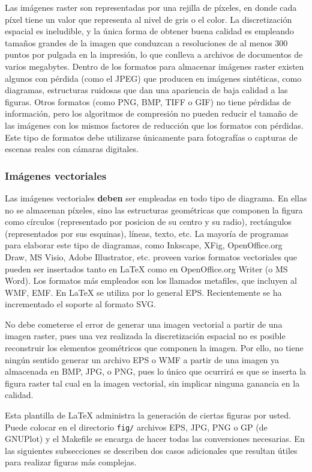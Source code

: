 Las imágenes raster son representadas por una rejilla de píxeles, en donde cada
píxel tiene un valor que representa al nivel de gris o el color. La
discretización espacial es ineludible, y la única forma de obtener buena
calidad es empleando tamaños grandes de la imagen que conduzcan a resoluciones
de al menos 300 puntos por pulgada en la impresión, lo que conlleva a archivos
de documentos de varios megabytes. Dentro de los formatos para almacenar
imágenes raster existen algunos con pérdida (como el JPEG) que producen en
imágenes sintéticas, como diagramas, estructuras ruidosas que dan una
apariencia de baja calidad a las figuras. Otros formatos (como PNG, BMP, TIFF o
GIF) no tiene pérdidas de información, pero los algoritmos de compresión no
pueden reducir el tamaño de las imágenes con los mismos factores de reducción
que los formatos con pérdidas. Este tipo de formatos debe utilizarse únicamente
para fotografías o capturas de escenas reales con cámaras digitales.

\subsubsection{Imágenes vectoriales}

Las imágenes vectoriales \textbf{deben} ser empleadas en todo tipo de
diagrama. En ellas no se almacenan píxeles, sino las estructuras geométricas
que componen la figura como círculos (representado por posicion de su centro y
su radio), rectángulos (representados por sus esquinas), líneas, texto, etc. La
mayoría de programas para elaborar este tipo de diagramas, como Inkscape, XFig,
OpenOffice.org Draw, MS Visio, Adobe Illustrator, etc. proveen varios formatos
vectoriales que pueden ser insertados tanto en LaTeX como en OpenOffice.org
Writer (o MS Word). Los formatos más empleados son los llamados metafiles, que
incluyen al WMF, EMF. En LaTeX se utiliza por lo general EPS. Recientemente se
ha incrementado el soporte al formato SVG.

No debe cometerse el error de generar una imagen vectorial a partir de una
imagen raster, pues una vez realizada la discretización espacial no es posible
reconstruir los elementos geométricos que componen la imagen. Por ello, no
tiene ningún sentido generar un archivo EPS o WMF a partir de una imagen ya
almacenada en BMP, JPG, o PNG, pues lo único que ocurrirá es que se inserta la
figura raster tal cual en la imagen vectorial, sin implicar ninguna ganancia en
la calidad.

Esta plantilla de LaTeX administra la generación de ciertas figuras por usted.
Puede colocar en el directorio \texttt{fig/} archivos EPS, JPG, PNG o GP (de
GNUPlot) y el Makefile se encarga de hacer todas las conversiones necesarias.
En las siguientes subsecciones se describen dos casos adicionales que resultan
útiles para realizar figuras más complejas.

